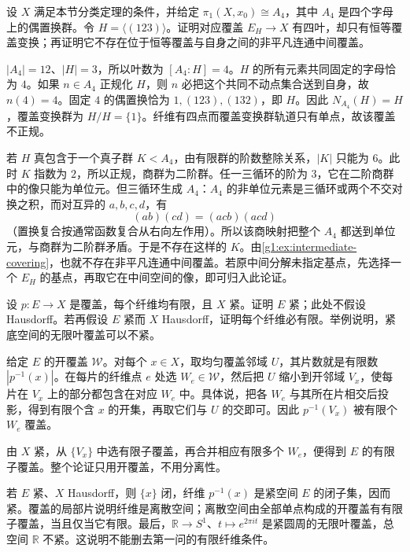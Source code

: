 \begin{exercise}\label{g1:ex:a4-nonregular-cover}
	设 \(X\) 满足本节分类定理的条件，并给定 \(\pi_1(X,x_0)\cong A_4\)，其中 \(A_4\) 是四个字母上的偶置换群。令 \(H=\langle(123)\rangle\)。证明对应覆盖 \(E_H\to X\) 有四叶，却只有恒等覆盖变换；再证明它不存在位于恒等覆盖与自身之间的非平凡连通中间覆盖。
\end{exercise}
\begin{solution}
	\(|A_4|=12\)、\(|H|=3\)，所以叶数为 \([A_4:H]=4\)。\(H\) 的所有元素共同固定的字母恰为 \(4\)。如果 \(n\in A_4\) 正规化 \(H\)，则 \(n\) 必把这个共同不动点集合送到自身，故 \(n(4)=4\)。固定 \(4\) 的偶置换恰为 \(1,(123),(132)\)，即 \(H\)。因此 \(N_{A_4}(H)=H\)，覆盖变换群为 \(H/H=\{1\}\)。纤维有四点而覆盖变换群轨道只有单点，故该覆盖不正规。

	若 \(H\) 真包含于一个真子群 \(K<A_4\)，由有限群的阶数整除关系，\(|K|\) 只能为 \(6\)。此时 \(K\) 指数为 \(2\)，所以正规，商群为二阶群。任一三循环的阶为 \(3\)，它在二阶商群中的像只能为单位元。但三循环生成 \(A_4\)：\(A_4\) 的非单位元素是三循环或两个不交对换之积，而对互异的 \(a,b,c,d\)，有
	\[
		(ab)(cd)=(acb)(acd)
	\]
	（置换复合按通常函数复合从右向左作用）。所以该商映射把整个 \(A_4\) 都送到单位元，与商群为二阶群矛盾。于是不存在这样的 \(K\)。由\cref{g1:ex:intermediate-covering}，也就不存在非平凡连通中间覆盖。若原中间分解未指定基点，先选择一个 \(E_H\) 的基点，再取它在中间空间的像，即可归入此论证。
\end{solution}

\begin{exercise}\label{g1:ex:finite-cover-compactness}
	设 \(p:E\to X\) 是覆盖，每个纤维均有限，且 \(X\) 紧。证明 \(E\) 紧；此处不假设 Hausdorff。若再假设 \(E\) 紧而 \(X\) Hausdorff，证明每个纤维必有限。举例说明，紧底空间的无限叶覆盖可以不紧。
\end{exercise}
\begin{solution}
	给定 \(E\) 的开覆盖 \(\mathcal W\)。对每个 \(x\in X\)，取均匀覆盖邻域 \(U\)，其片数就是有限数 \(|p^{-1}(x)|\)。在每片的纤维点 \(e\) 处选 \(W_e\in\mathcal W\)，然后把 \(U\) 缩小到开邻域 \(V_x\)，使每片在 \(V_x\) 上的部分都包含在对应 \(W_e\) 中。具体说，把各 \(W_e\) 与其所在片相交后投影，得到有限个含 \(x\) 的开集，再取它们与 \(U\) 的交即可。因此 \(p^{-1}(V_x)\) 被有限个 \(W_e\) 覆盖。

	由 \(X\) 紧，从 \(\{V_x\}\) 中选有限子覆盖，再合并相应有限多个 \(W_e\)，便得到 \(E\) 的有限子覆盖。整个论证只用开覆盖，不用分离性。

	若 \(E\) 紧、\(X\) Hausdorff，则 \(\{x\}\) 闭，纤维 \(p^{-1}(x)\) 是紧空间 \(E\) 的闭子集，因而紧。覆盖的局部片说明纤维是离散空间；离散空间由全部单点构成的开覆盖有有限子覆盖，当且仅当它有限。最后，\(\mathbb R\to S^1\)、\(t\mapsto e^{2\pi it}\) 是紧圆周的无限叶覆盖，总空间 \(\mathbb R\) 不紧。这说明不能删去第一问的有限纤维条件。
\end{solution}

